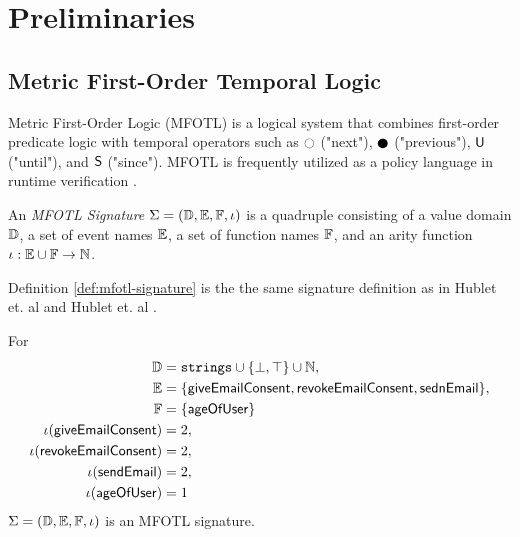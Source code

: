 \chapter{Preliminaries}
\label{chapter:preliminaries}


\section{Metric First-Order Temporal Logic}
\label{section:mfotl}

Metric First-Order Logic (MFOTL)
\cite{basin2015monitoring, chomicki1995efficient}
is a logical system that combines
first-order predicate logic with temporal operators such as
$\Next$ ("next"), $\Prev$ ("previous"), $\mathbin{\mathsf{U}}$ ("until"), and $\mathbin{\mathsf{S}}$ ("since").
MFOTL is frequently utilized as a policy language in
runtime verification \cite{whyenf, lex, basin2015monitoring}.

\begin{definition}
    \label{def:mfotl-signature}
    An \emph{MFOTL Signature}
    $\Sigma = (\mathbb{D}, \mathbb{E}, \mathbb{F}, \iota)$
    is a quadruple consisting of
    a value domain $\mathbb{D}$,
    a set of event names $\mathbb{E}$,
    a set of function names $\mathbb{F}$,
    and an arity function $\iota : \mathbb{E} \cup \mathbb{F} \to \mathbb{N}$.
\end{definition}
Definition \ref{def:mfotl-signature} is the the same signature
definition as in Hublet et. al \cite[Section 2.2.2]{lex}
and Hublet et. al \cite[Section 2]{whyenf}.
\begin{example}
    \label{ex:signature}
    For
    \begin{align*}
        \Domain &= \texttt{strings} \cup \{ \bot, \top \} \cup \Nat, \\
        \Events &= \{ \mathsf{giveEmailConsent},
                      \mathsf{revokeEmailConsent},
                      \mathsf{sednEmail}
                      \}, \\
        \Functions &= \{ \mathsf{ageOfUser} \} \\
        \iota(\mathsf{giveEmailConsent}) &= 2, \\ %
        \iota(\mathsf{revokeEmailConsent}) &= 2, \\ %
        \iota(\mathsf{sendEmail}) &= 2, \\ %
        \iota(\mathsf{ageOfUser}) &= 1
    \end{align*}
    $\Sigma = (\mathbb{D}, \mathbb{E}, \mathbb{F}, \iota)$
    is an MFOTL signature.
\end{example}

